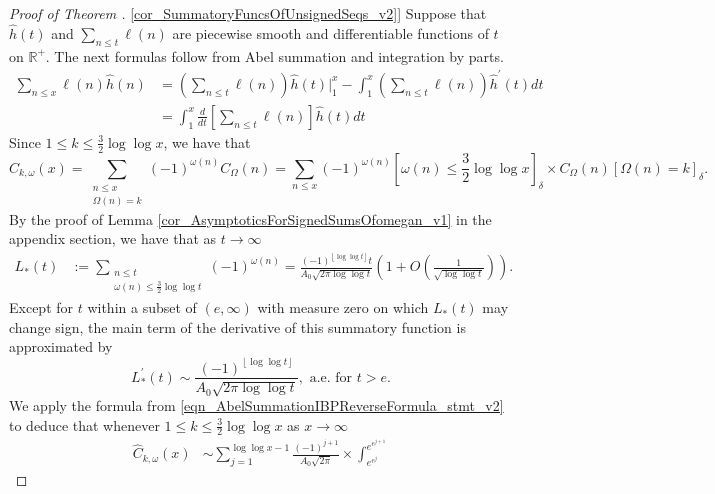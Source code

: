 \documentclass[11pt,reqno,a4letter]{article}
\newcommand{\hlocalref}[1]{\hyperref[#1]{\ref{#1}}}
\numberwithin{equation}{section}
\numberwithin{figure}{section}
\numberwithin{table}{section}
\newcommand{\Iverson}[1]{\ensuremath{\left[#1\right]_{\delta}}}
\newcommand{\floor}[1]{\left\lfloor #1 \right\rfloor}
\theoremstyle{plain}
\numberwithin{theorem}{section}
\theoremstyle{definition}
\begin{document}
\begin{proof}[Proof of Theorem \hlocalref{cor_SummatoryFuncsOfUnsignedSeqs_v2}]  
Suppose that $\hat{h}(t)$ and $\sum_{n \leq t} \ell(n)$ are 
piecewise smooth and differentiable functions of $t$ on $\mathbb{R}^{+}$. 
The next formulas follow from Abel summation and integration by parts. 
\begin{subequations}
\begin{align} 
\label{eqn_AbelSummationIBPReverseFormula_stmt_v1} 
     \sum_{n \leq x} \ell(n) \hat{h}(n) & = 
     \left(\sum_{n \leq t} \ell(n)\right) \hat{h}(t) \Biggr\rvert_1^x - 
     \int_{1}^{x} \left(\sum_{n \leq t} \ell(n)\right) \hat{h}^{\prime}(t) dt \\ 
\label{eqn_AbelSummationIBPReverseFormula_stmt_v2}
     & = 
     \int_1^{x} \frac{d}{dt}\left[\sum_{n \leq t} \ell(n)\right] \hat{h}(t) dt
\end{align} 
\end{subequations}
Since $1 \leq k \leq \frac{3}{2} \log\log x$, we have that 
\[
\widehat{C}_{k,\omega}(x) = 
     \sum_{\substack{n \leq x \\ \Omega(n)=k}} (-1)^{\omega(n)} C_{\Omega}(n) = 
     \sum_{n \leq x} (-1)^{\omega(n)} \Iverson{\omega(n) \leq \frac{3}{2} \log\log x} \times 
     C_{\Omega}(n) \Iverson{\Omega(n) = k}. 
\]
By the proof of Lemma \hlocalref{cor_AsymptoticsForSignedSumsOfomegan_v1} 
in the appendix section, we have 
that as $t \rightarrow \infty$ 
\begin{align} 
\label{eqn_ProofTag_LAsttSummatoryFuncAsymptotics_v1}
L_{\ast}(t) & := \sum_{\substack{n \leq t \\ \omega(n) \leq \frac{3}{2} \log\log t}} 
     (-1)^{\omega(n)} 
     = \frac{(-1)^{\floor{\log\log t}} t}{A_0 \sqrt{2\pi \log\log t}}\left(1 + 
     O\left(\frac{1}{\sqrt{\log\log t}}\right)\right). 
\end{align} 
Except for $t$ within a subset of $(e, \infty)$ with measure zero on which 
$L_{\ast}(t)$ may change sign, the main term of the derivative of this summatory function 
is approximated by 
\[
L_{\ast}^{\prime}(t) \sim \frac{(-1)^{\floor{\log\log t}}}{A_0 \sqrt{2\pi \log\log t}}, 
     \text{ a.e.\ for } t > e. 
\]
We apply the formula from \eqref{eqn_AbelSummationIBPReverseFormula_stmt_v2}  
to deduce that whenever $1 \leq k \leq \frac{3}{2} \log\log x$ as $x \rightarrow \infty$  
\begin{align*} 
     \widehat{C}_{k,\omega}(x) & \sim 
     \sum_{j=1}^{\log\log x-1} \frac{(-1)^{j+1}}{A_0\sqrt{2\pi}} \times \int_{e^{e^j}}^{e^{e^{j+1}}} 

\end{align*}
\end{proof}
\end{document}
